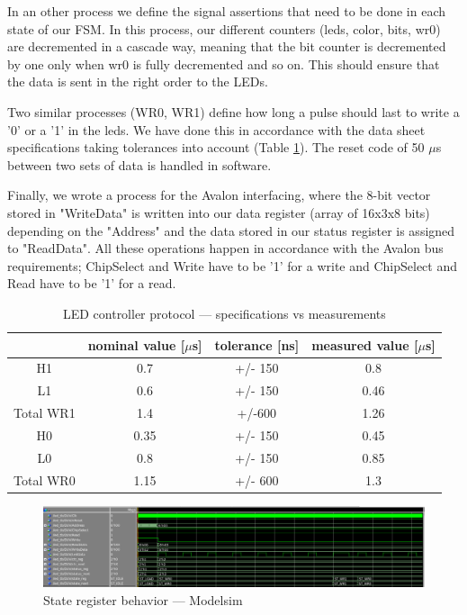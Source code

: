 \documentclass{article}
\begin{document}
In an other process we define the signal assertions that need to be done in each state of our FSM. In this process, our different counters (leds, color, bits, wr0) are decremented in a cascade way, meaning that the bit counter is decremented by one only when wr0 is fully decremented and so on.
This should ensure that the data is sent in the right order to the LEDs.

Two similar processes (WR0, WR1) define how long a pulse should last to write a '0' or a '1' in the leds. We have done this in accordance with the data sheet specifications taking tolerances into account (Table \ref{tab:1}). The reset code of 50 $\mu$s between two sets of data is handled in software.

Finally, we wrote a process for the Avalon interfacing, where the 8-bit vector stored in "WriteData" is written into our data register (array of 16x3x8 bits) depending on the "Address" and the data stored in our status register is assigned to "ReadData". All these operations happen in accordance with the Avalon bus requirements; ChipSelect and Write have to be '1' for a write and ChipSelect and Read have to be '1' for a read.

\begin{table}[H]
    \centering
    \begin{tabular}{|c||c|c|c|}
    \hline
     & nominal value [$\mu$s] & tolerance [ns] & measured value [$\mu$s] \\
    \hline
    \hline
    H1 & 0.7 & +/- 150 & 0.8 \\
    \hline
    L1 & 0.6 & +/- 150 & 0.46 \\
    \hline
    Total WR1 & 1.4 & +/-600 & 1.26 \\
    \hline
    H0 & 0.35 & +/- 150 & 0.45 \\
    \hline
    L0 & 0.8 & +/- 150 & 0.85 \\
    \hline
    Total WR0 & 1.15 & +/- 600 & 1.3 \\
    \hline
    \end{tabular}
    \caption{LED controller protocol --- specifications vs measurements}
    \label{tab:1}
\end{table}


\begin{figure}[H]
    \centering
    \includegraphics[width=\textwidth]{modelsim_states}
    \caption{State register behavior --- Modelsim}
    \label{fig:SRBM}
\end{figure}
\end{document}
